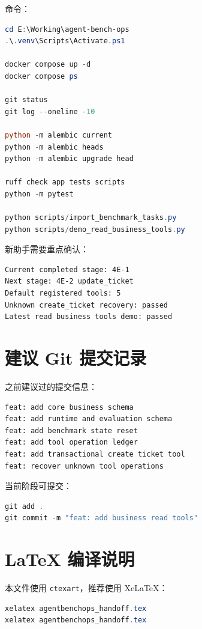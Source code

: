 \documentclass[11pt,a4paper]{ctexart}
\begin{document}
命令：

\begin{lstlisting}[language=PowerShell]
cd E:\Working\agent-bench-ops
.\.venv\Scripts\Activate.ps1

docker compose up -d
docker compose ps

git status
git log --oneline -10

python -m alembic current
python -m alembic heads
python -m alembic upgrade head

ruff check app tests scripts
python -m pytest

python scripts/import_benchmark_tasks.py
python scripts/demo_read_business_tools.py
\end{lstlisting}

新助手需要重点确认：

\begin{lstlisting}
Current completed stage: 4E-1
Next stage: 4E-2 update_ticket
Default registered tools: 5
Unknown create_ticket recovery: passed
Latest read business tools demo: passed
\end{lstlisting}

\section{建议 Git 提交记录}

之前建议过的提交信息：

\begin{lstlisting}
feat: add core business schema
feat: add runtime and evaluation schema
feat: add benchmark state reset
feat: add tool operation ledger
feat: add transactional create ticket tool
feat: recover unknown tool operations
\end{lstlisting}

当前阶段可提交：

\begin{lstlisting}[language=PowerShell]
git add .
git commit -m "feat: add business read tools"
\end{lstlisting}

\section{LaTeX 编译说明}

本文件使用 \texttt{ctexart}，推荐使用 XeLaTeX：

\begin{lstlisting}[language=PowerShell]
xelatex agentbenchops_handoff.tex
xelatex agentbenchops_handoff.tex
\end{lstlisting}
\end{document}
